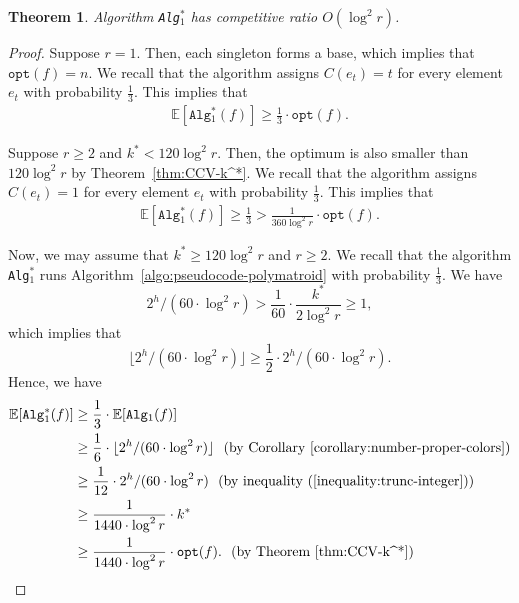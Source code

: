 \documentclass[11pt]{article}
\newtheorem{theorem}{Theorem}
\theoremstyle{definition}
\newcommand{\opt}{\texttt{opt}}
\begin{document}
\begin{theorem}\label{theorem:polymatroid-combined-ratio}
    Algorithm \texttt{Alg$_1^*$} has competitive ratio $O(\log^2 r)$.
\end{theorem}
\begin{proof}
    Suppose $r=1$. Then, each singleton forms a base, which implies that $\opt(f)=n$. We recall that the algorithm assigns $C(e_t)=t$ for every element $e_t$ with probability $\frac{1}{3}$. This implies that
    $$\begin{aligned}
        \mathbb{E}[\texttt{Alg$_1^*$}(f)] \geq \frac{1}{3}\cdot \opt(f).
    \end{aligned}$$

    Suppose $r\geq 2$ and $k^*< 120\log^2 r$. Then, the optimum is also smaller than $120\log^2 r$ by Theorem~\ref{thm:CCV-k^*}. We recall that the algorithm assigns $C(e_t)=1$ for every element $e_t$ with probability $\frac{1}{3}$. This implies that
    $$\begin{aligned}
        \mathbb{E}[\texttt{Alg$_1^*$}(f)] \geq \frac{1}{3} > \frac{1}{360\log^2 r}\cdot \opt(f).
    \end{aligned}$$

    Now, we may assume that $k^*\geq 120\log^2 r$ and $r\geq 2$. We recall that the algorithm \texttt{Alg$_1^*$} runs Algorithm~\ref{algo:pseudocode-polymatroid} with probability $\frac{1}{3}$. We have
    \begin{equation}\label{inequality:positive-assumption-k}
    2^h/ (60\cdot \log^2 r)> \frac{1}{60}\cdot \frac{k^*}{2\log^2 r}\geq 1,
    \end{equation}
    which implies that
    \begin{equation}\label{inequality:trunc-integer}
        \lfloor 2^h/ (60\cdot \log^2 r) \rfloor \geq \frac{1}{2}\cdot 2^h/ (60\cdot \log^2 r).
    \end{equation}
    Hence, we have
    $$\begin{aligned}
        \mathbb{E}[\texttt{Alg$_1^*$}(f)]&\geq \frac{1}{3}\cdot \mathbb{E}[\texttt{Alg$_1$}(f)] \\
        &\geq \frac{1}{6}\cdot \lfloor 2^h/ (60\cdot \log^2 r)\rfloor \ \ \text{(by Corollary~\ref{corollary:number-proper-colors})}\\
        &\geq \frac{1}{12}\cdot 2^h/ (60\cdot \log^2 r) \ \ \text{(by inequality~(\ref{inequality:trunc-integer}))}\\
        &\geq \frac{1}{1440\cdot \log^2r}\cdot k^* \\
        &\geq \frac{1}{1440\cdot \log^2r}\cdot \opt(f). \ \ \text{(by Theorem~\ref{thm:CCV-k^*})}
    \end{aligned}$$
\end{proof}
\end{document}
